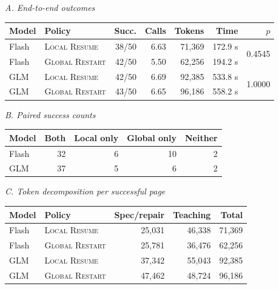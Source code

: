 \documentclass[letterpaper]{article}
\newcommand{\localresume}{\textsc{Local Resume}}
\newcommand{\globalrestart}{\textsc{Global Restart}}
\newenvironment{coltable}
  {\begin{center}\begin{minipage}{\columnwidth}\centering}
  {\end{minipage}\end{center}}
\begin{document}
\begin{coltable}
\small
\setlength{\tabcolsep}{2pt}
\textit{A. End-to-end outcomes}\par
\begin{tabular*}{\columnwidth}{@{\extracolsep{\fill}}llrrrrr@{}}
\toprule
Model & Policy & Succ. & Calls & Tokens & Time & $p$ \\
\midrule
Flash & \localresume{} & 38/50 & 6.63 & 71,369 & 172.9 s & \multirow{2}{*}{0.4545} \\
Flash & \globalrestart{} & 42/50 & 5.50 & 62,256 & 194.2 s & \\
GLM & \localresume{} & 42/50 & 6.69 & 92,385 & 533.8 s & \multirow{2}{*}{1.0000} \\
GLM & \globalrestart{} & 43/50 & 6.65 & 96,186 & 558.2 s & \\
\bottomrule
\end{tabular*}

\smallskip
\textit{B. Paired success counts}\par
\begin{tabular*}{\columnwidth}{@{\extracolsep{\fill}}lrrrr@{}}
\toprule
Model & Both & Local only & Global only & Neither \\
\midrule
Flash & 32 & 6 & 10 & 2 \\
GLM & 37 & 5 & 6 & 2 \\
\bottomrule
\end{tabular*}

\smallskip
\textit{C. Token decomposition per successful page}\par
\begin{tabular*}{\columnwidth}{@{\extracolsep{\fill}}llrrr@{}}
\toprule
Model & Policy & Spec/repair & Teaching & Total \\
\midrule
Flash & \localresume{} & 25,031 & 46,338 & 71,369 \\
Flash & \globalrestart{} & 25,781 & 36,476 & 62,256 \\
GLM & \localresume{} & 37,342 & 55,043 & 92,385 \\
GLM & \globalrestart{} & 47,462 & 48,724 & 96,186 \\
\bottomrule
\end{tabular*}
\label{tab:recovery-full}
\label{tab:recovery-pairs}
\label{tab:recovery-cost}
\end{coltable}
\end{document}
